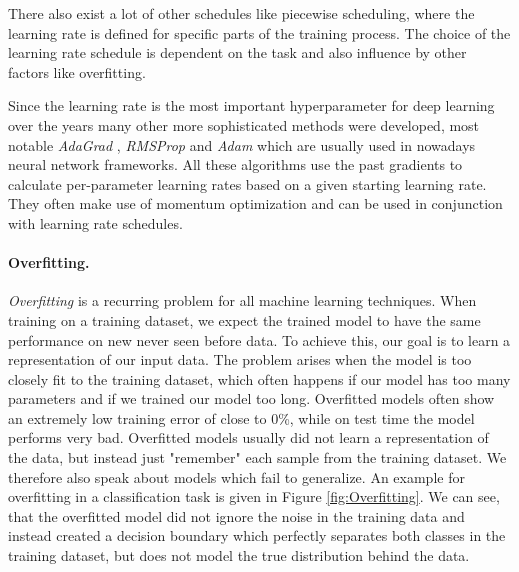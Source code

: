 There also exist a lot of other schedules like piecewise scheduling, where the learning rate is defined for specific parts of the training process. The choice of the learning rate schedule is dependent on the task and also influence by other factors like overfitting.

Since the learning rate is the most important hyperparameter for deep learning over the years many other more sophisticated methods were developed, most notable \textit{AdaGrad} \cite{duchi2011adaptive}, \textit{RMSProp} \cite{tieleman2012lecture} and \textit{Adam} \cite{kingma2014adam} which are usually used in nowadays neural network frameworks. All these algorithms use the past gradients to calculate per-parameter learning rates based on a given starting learning rate. They often make use of momentum optimization and can be used in conjunction with learning rate schedules.


\paragraph{Overfitting.}
\textit{Overfitting} is a recurring problem for all machine learning techniques. When training on a training dataset, we expect the trained model to have the same performance on new never seen before data. To achieve this, our goal is to learn a representation of our input data. The problem arises when the model is too closely fit to the training dataset, which often happens if our model has too many parameters and if we trained our model too long. Overfitted models often show an extremely low training error of close to 0\%, while on test time  the model performs very bad. Overfitted models usually did not learn a representation of the data, but instead just "remember" each sample from the training dataset. We therefore also speak about models which fail to generalize. An example for overfitting in a classification task is given in Figure \ref{fig:Overfitting}. We can see, that the overfitted model did not ignore the noise in the training data and instead created a decision boundary which perfectly separates both classes in the training dataset, but does not model the true distribution behind the data.


